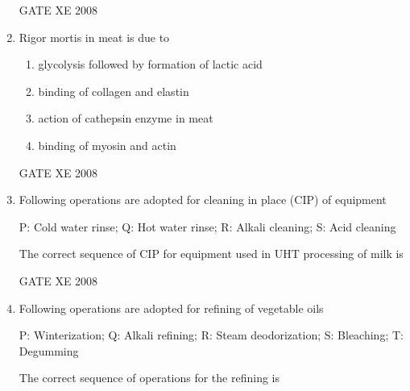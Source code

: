 \documentclass[12pt]{article}
\begin{document}
\begin{enumerate}
GATE XE 2008  

\item Rigor mortis in meat is due to  

\begin{enumerate}
\item  glycolysis followed by formation of lactic acid  
\item  binding of collagen and elastin  
\item  action of cathepsin enzyme in meat  
\item  binding of myosin and actin  
\end{enumerate}

GATE XE 2008  

\item Following operations are adopted for cleaning in place (CIP) of equipment  

P: Cold water rinse; Q: Hot water rinse; R: Alkali cleaning; S: Acid cleaning  

The correct sequence of CIP for equipment used in UHT processing of milk is  

\begin{enumerate}
\end{enumerate}

GATE XE 2008  

\item Following operations are adopted for refining of vegetable oils  

P: Winterization; Q: Alkali refining; R: Steam deodorization; S: Bleaching; T: Degumming  

The correct sequence of operations for the refining is  

\begin{enumerate}
\end{enumerate}


\end{enumerate}
\end{document}
